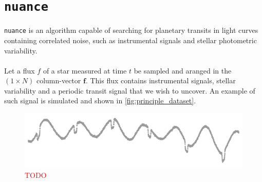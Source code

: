 \documentclass{aastex631}
\newcommand{\TODO}{\textcolor{red}{TODO}}
\begin{document}
\section{\texttt{nuance}}\label{nuance}

\texttt{nuance} is an algorithm capable of searching for planetary transits in light curves containing correlated noise, such as instrumental signals and stellar photometric variability.
\\\\
Let a flux $f$ of a star measured at time $t$ be sampled and aranged in the $(1\times N)$ column-vector $\bm{f}$. This flux contains instrumental signals, stellar variability and a periodic transit signal that we wish to uncover. An example of such signal is simulated and shown in \autoref{fig:principle_dataset}.

\begin{figure}[H]
    \begin{centering}
        \includegraphics[width=0.7\linewidth]{../figures/principle_dataset.pdf}
        \caption{\TODO}
        \label{fig:principle_dataset}
    \end{centering}
\end{figure}
\end{document}
